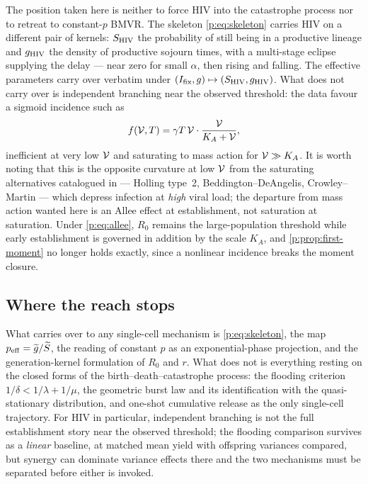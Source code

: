 The position taken here is neither to force HIV into the catastrophe process
nor to retreat to constant-$p$ BMVR. The skeleton \cref{p:eq:skeleton}
carries HIV on a different pair of kernels: $S_{\rm HIV}$ the probability of
still being in a productive lineage and $g_{\rm HIV}$ the density of
productive sojourn times, with a multi-stage eclipse supplying the delay ---
near zero for small $\alpha$, then rising and falling. The effective
parameters carry over verbatim under
$(I_{\mathrm{fix}},g)\mapsto(S_{\rm HIV},g_{\rm HIV})$. What does not carry over is
independent branching near the observed threshold: the data favour a sigmoid
incidence such as
\begin{equation}
f(\mathcal{V},T)=\gamma T\,\mathcal{V}\cdot\frac{\mathcal{V}}{K_A+\mathcal{V}},
\label{p:eq:allee}
\end{equation}
inefficient at very low $\mathcal{V}$ and saturating to mass action for
$\mathcal{V}\gg K_A$. It is worth noting that this is the opposite curvature at
low $\mathcal{V}$ from the saturating alternatives catalogued in
\cite{ciupe2024incorporating} --- Holling type~2, Beddington--DeAngelis,
Crowley--Martin --- which depress infection at \emph{high} viral load; the
departure from mass action wanted here is an Allee effect at establishment,
not saturation at saturation. Under \cref{p:eq:allee}, $R_0$ remains the
large-population threshold while early establishment is governed in addition
by the scale $K_A$, and \cref{p:prop:first-moment} no longer holds exactly,
since a nonlinear incidence breaks the moment closure.

\subsection{Where the reach stops}

What carries over to any single-cell mechanism is \cref{p:eq:skeleton}, the
map $p_{\rm eff}=\widetilde{g}/\widetilde{S}$, the reading of constant $p$ as an
exponential-phase projection, and the generation-kernel formulation of $R_0$
and $r$. What does not is everything resting on the closed forms of the
birth--death--catastrophe process: the flooding criterion
$1/\delta<1/\lambda+1/\mu$, the geometric burst law and its identification
with the quasi-stationary distribution, and one-shot cumulative release as
the only single-cell trajectory. For HIV in particular, independent
branching is not the full establishment story near the observed threshold;
the flooding comparison survives as a \emph{linear} baseline, at matched
mean yield with offspring variances compared, but synergy can dominate
variance effects there and the two mechanisms must be separated before
either is invoked.


